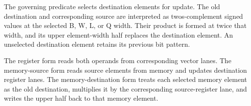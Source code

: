 The governing predicate selects destination elements for update. The old
destination and corresponding source are interpreted as two\textquotesingle{}s-complement signed
values at the selected B, W, L, or Q width. Their product is formed at twice
that width, and its upper element-width half replaces the destination element.
An unselected destination element retains its previous bit pattern.

The register form reads both operands from corresponding vector lanes. The
memory-source form reads source elements from memory and updates destination
register lanes. The memory-destination form treats each selected memory element
as the old destination, multiplies it by the corresponding source-register
lane, and writes the upper half back to that memory element.
